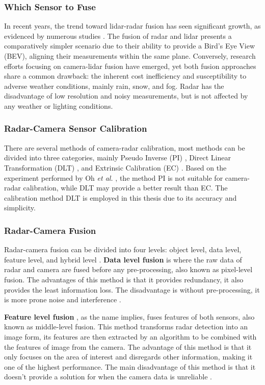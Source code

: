 \subsubsection{Which Sensor to Fuse}
In recent years, the trend toward lidar-radar fusion has seen significant growth, as evidenced by numerous studies \cite{abs180711264}\cite{7579940}. 
The fusion of radar and lidar presents a comparatively simpler scenario due to their ability to provide a Bird's Eye View (BEV), 
aligning their measurements within the same plane. 
Conversely, research efforts focusing on camera-lidar fusion \cite{chen2017multiview}\cite{li2016vehicle} have emerged, 
yet both fusion approaches share a common drawback:
the inherent cost inefficiency and susceptibility to adverse weather conditions, mainly rain, snow, and fog.
Radar has the disadvantage of low resolution and noisy measurements, but is not affected by any weather or lighting conditions.

\subsubsection{Radar-Camera Sensor Calibration}
There are several methods of camera-radar calibration, 
most methods can be divided into three categories, mainly Pseudo Inverse (PI) \cite{s110908992}, 
Direct Linear Transformation (DLT) \cite{KIM2014641}, and Extrinsic Calibration (EC) \cite{4632220}.
Based on the experiment performed by Oh \textit{et al.} \cite{8581329}, the method PI is not suitable for camera-radar calibration, 
while DLT may provide a better result than EC.
The calibration method DLT is employed in this thesis due to its accuracy and simplicity.

\subsubsection{Radar-Camera Fusion}
Radar-camera fusion can be divided into four levels: object level, data level, feature level, and hybrid level \cite{10225711}.
\textbf{Data level fusion} \cite{bansal2022radsegnet} is where the raw data of radar and camera are fused before any pre-processing, also known as pixel-level fusion.
The advantages of this method is that it provides redundancy, it also provides the least information loss. 
The disadvantage is without pre-processing, it is more prone noise and interference \cite{wei2022mmwave}.

\textbf{Feature level fusion} \cite{chadwick2019distant}, as the name implies, fuses features of both sensors, also known as middle-level fusion.
This method transforms radar detection into an image form, 
its features are then extracted by an algorithm to be combined with the features of image from the camera.
The advantage of this method is that it only focuses on the area of interest and disregards other information, making it one of the highest performance.
The main disadvantage of this method is that it doesn't provide a solution for when the camera data is unreliable \cite{10225711}.
 
